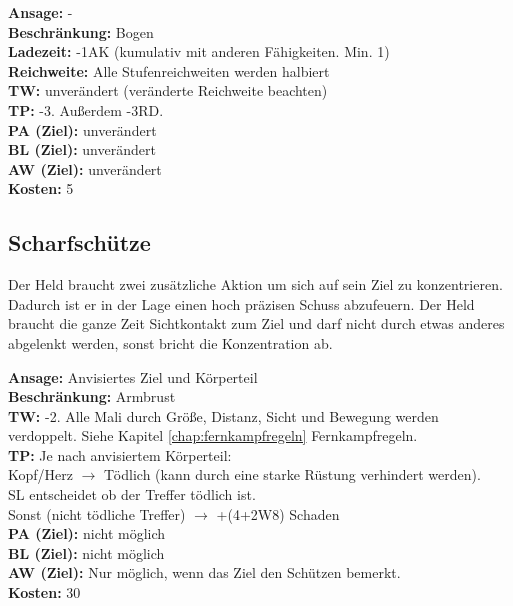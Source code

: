 \textbf{Ansage:} - \\
\textbf{Beschränkung:} Bogen \\
\textbf{Ladezeit:} -1AK (kumulativ mit anderen Fähigkeiten. Min. 1) \\
\textbf{Reichweite:} Alle Stufenreichweiten werden halbiert \\
\textbf{TW:} unverändert (veränderte Reichweite beachten) \\
\textbf{TP:} -3. Außerdem -3RD. \\
\textbf{PA (Ziel):} unverändert \\
\textbf{BL (Ziel):} unverändert \\
\textbf{AW (Ziel):} unverändert \\
\textbf{Kosten:} 5

\subsection{Scharfschütze}
Der Held braucht zwei zusätzliche Aktion um sich auf sein Ziel zu konzentrieren. Dadurch ist er in der Lage einen hoch präzisen Schuss abzufeuern. Der Held braucht die ganze Zeit Sichtkontakt zum Ziel und darf nicht durch etwas anderes abgelenkt werden, sonst bricht die Konzentration ab.

\textbf{Ansage:} Anvisiertes Ziel und Körperteil \\
\textbf{Beschränkung:} Armbrust \\
\textbf{TW:} -2. Alle Mali durch Größe, Distanz, Sicht und Bewegung werden verdoppelt. Siehe Kapitel \ref{chap:fernkampfregeln} Fernkampfregeln. \\
\textbf{TP:} Je nach anvisiertem Körperteil: \\
\tab Kopf/Herz $\rightarrow$ Tödlich (kann durch eine starke Rüstung verhindert werden). \\
\tab SL entscheidet ob der Treffer tödlich ist. \\
\tab Sonst (nicht tödliche Treffer) $\rightarrow$ +(4+2W8) Schaden \\
\textbf{PA (Ziel):} nicht möglich \\
\textbf{BL (Ziel):} nicht möglich \\
\textbf{AW (Ziel):} Nur möglich, wenn das Ziel den Schützen bemerkt. \\
\textbf{Kosten:} 30